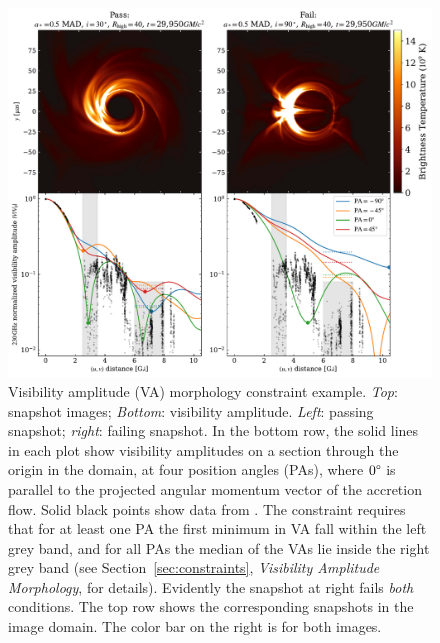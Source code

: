 \begin{figure}
  \centering\hspace{18pt}
  \includegraphics[width=6.5in]{figures/passfail_va.pdf}
  \caption{Visibility amplitude (VA) morphology constraint example.
    \emph{Top}: snapshot images;
    \emph{Bottom}: visibility amplitude.
    \emph{Left}: passing snapshot;
    \emph{right}: failing snapshot.
    In the bottom row, 
    the solid lines in each plot show visibility amplitudes on a section through the origin in the \uv domain, at four position angles (PAs), where $0\degree$ is parallel to the projected angular momentum vector of the accretion flow.
    Solid black points show data from \aprilvii.
    The \vam constraint requires that for at least one PA the first minimum in VA fall within the left grey band, and for all PAs the median of the VAs lie inside the right grey band (see Section~\ref{sec:constraints}, \emph{Visibility Amplitude Morphology}, for details).
    Evidently the snapshot at right fails {\em both} conditions.
    The top row shows the corresponding snapshots in the image domain.
    The color bar on the right is for both images.}
  \label{fig:passfail_va}
\end{figure}

